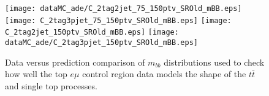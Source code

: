 \begin{figure}[hpbt!]
	\centering
  \texttt{[image: dataMC\_ade/C\_2tag2jet\_75\_150ptv\_SROld\_mBB.eps]}
  \texttt{[image: C\_2tag3pjet\_75\_150ptv\_SROld\_mBB.eps]}
  \texttt{[image: C\_2tag2jet\_150ptv\_SROld\_mBB.eps]}
  \texttt{[image: dataMC\_ade/C\_2tag3pjet\_150ptv\_SROld\_mBB.eps]}				
	\caption{Data versus prediction comparison of $m_{bb}$ distributions used to
    check how well the top $e\mu$ control region data models the shape of the
    $t\bar{t}$ and single top processes.}
	\label{fig:ttbardd-mbb}
\end{figure}
